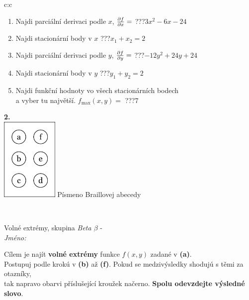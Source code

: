 \documentclass[10pt]{report}
\begin{document}
\begin{tabular}{c:c}
\begin{minipage}[c][104.5mm][t]{0.5\linewidth}
\begin{center}
\begin{minipage}{0.79\linewidth}
\begin{center}
\begin{varwidth}{\linewidth}
\begin{enumerate}
\item Najdi parciální derivaci podle $x$, $\pdv{f}{x}=$\quad \dotfill\; ???\;\dotfill \quad $3x^2-6x-24$
\item Najdi stacionární body v $x$\quad \dotfill\; ???\;\dotfill \quad $x_1+x_2=2$
\item Najdi parciální derivaci podle $y$, $\pdv{f}{y}=$\quad \dotfill\; ???\;\dotfill \quad $-12y^2+24y+24$
\item Najdi stacionární body v $y$\quad \dotfill\; ???\;\dotfill \quad $y_1+y_2=2$
\item Najdi funkční hodnoty vo všech stacionárních bodech \\ \phantom{xxxxxx} a vyber tu najvětší. $f_{\text{max}}(x,y)=$\quad \dotfill\; ???\;\dotfill \quad $7$
\end{enumerate}
\end{varwidth}
\end{center}
\end{minipage}
\begin{minipage}{0.20\linewidth}
\begin{center}
{\Huge\bfseries 2.} \\[2mm]
\includegraphics[height=40mm]{../images/braille.png}
{\small Písmeno Braillovej abecedy}
\end{center}
\end{minipage}
\end{center}
\end{minipage}
\\ \hdashline
\begin{minipage}[c][104.5mm][t]{0.5\linewidth}
\begin{center}
\vspace{7mm}
{\huge Volné extrémy, skupina \textit{Beta $\beta$} -}\\[5mm]
\textit{Jméno:}\phantom{xxxxxxxxxxxxxxxxxxxxxxxxxxxxxxxxxxxxxxxxxxxxxxxxxxxxxxxxxxxxxxxxx}\\[5mm]
\begin{minipage}{0.95\linewidth}
\begin{center}
Cílem je najít \textbf{volné extrémy} funkce $f(x,y)$ zadané v \textbf{(a)}.\\Postupuj podle krokú v \textbf{(b)} až \textbf{(f)}. Pokud se medzivýsledky shodujú s těmi za otazníky,\\tak napravo obarvi příslušející kroužek načerno. \textbf{Spolu odevzdejte výsledné slovo}.

\end{center}
\end{minipage}
\end{center}
\end{minipage}
\end{tabular}
\end{document}

